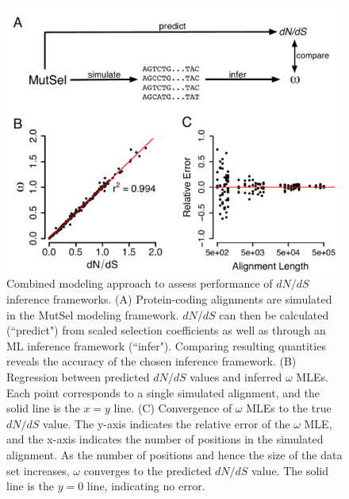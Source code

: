 \documentclass[11pt]{article}
\begin{document}
\begin{figure}[htbp]
	\centerline{\includegraphics[width=12cm]{figures/MainText/regression_convergence.pdf}}
	\caption{\label{reg_conv} Combined modeling approach to assess performance of $dN/dS$ inference frameworks. (A) Protein-coding alignments are simulated in the MutSel modeling framework. $dN/dS$ can then be calculated (``predict") from scaled selection coefficients as well as through an ML inference framework (``infer"). Comparing resulting quantities reveals the accuracy of the chosen inference framework. (B) Regression between predicted $dN/dS$ values and inferred $\omega$ MLEs. Each point corresponds to a single simulated alignment, and the solid line is the $x=y$ line. (C) Convergence of $\omega$ MLEs to the true $dN/dS$ value. The y-axis indicates the relative error of the $\omega$ MLE, and the x-axis indicates the number of positions in the simulated alignment. As the number of positions and hence the size of the data set increases, $\omega$ converges to the predicted $dN/dS$ value. The solid line is the $y=0$ line, indicating no error.}
\end{figure}
	
\vspace{2cm}
	
\end{document}
